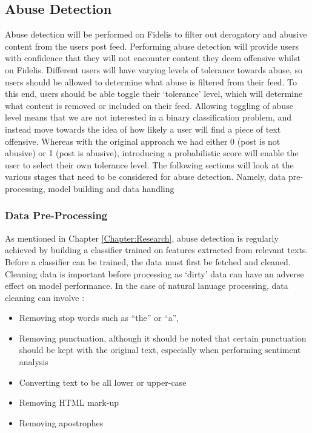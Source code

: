 \subsection{Abuse Detection}
\label{sec:abuse-detection}
Abuse detection will be performed on Fidelis to filter out derogatory and abusive content from the users post feed. Performing abuse detection will provide users with confidence that they will not encounter content they deem offensive whilst on Fidelis. Different users will have varying levels of tolerance towards abuse, so users should be allowed to determine what abuse is filtered from their feed. To this end, users should be able toggle their `tolerance' level, which will determine what content is removed or included on their feed. Allowing toggling of abuse level means that we are not interested in a binary classification problem, and instead move towards the idea of how likely a user will find a piece of text offensive. Whereas with the original approach we had either 0 (post is not abusive) or 1 (post is abusive), introducing a probabilistic score will enable the user to select their own tolerance level. The following sections will look at the various stages that need to be considered for abuse detection. Namely, data pre-processing, model building and data handling

\subsubsection{Data Pre-Processing}
As mentioned in Chapter \ref{Chapter:Research}, abuse detection is regularly achieved by building a classifier trained on features extracted from relevant texts. Before a classifier can be trained, the data must first be fetched and cleaned. Cleaning data is important before processing as `dirty' data can have an adverse effect on model performance. In the case of natural lanuage processing, data cleaning can involve \cite{han2011data}:
\begin{itemize}
\item Removing stop words such as ``the'' or ``a'', 
\item Removing punctuation, although it should be noted that certain punctuation should be kept with the original text, especially when performing sentiment analysis
\item Converting text to be all lower or upper-case
\item Removing HTML mark-up
\item Removing apostrophes
\end{itemize}

